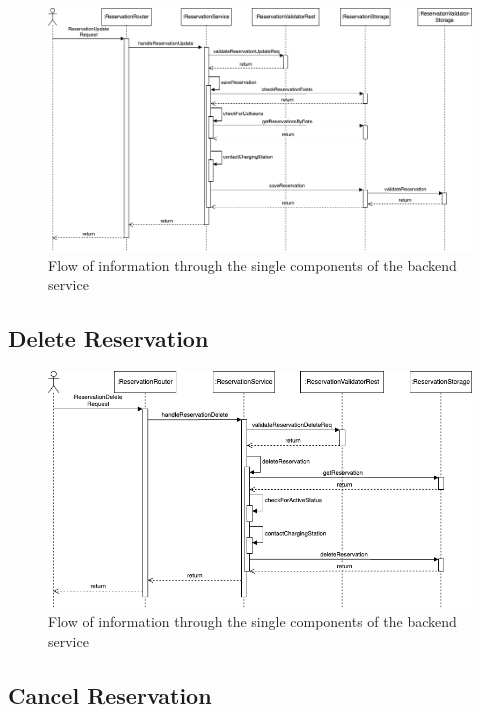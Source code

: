 \begin{figure}[!ht]
    \centering
    \includegraphics[scale=0.4]{resources/images/main/6_implementation/ReservationUpdate.png}
    \caption{Flow of information through the single components of the backend service}
    \label{fig:update-reservation-seq-flow}
\end{figure}

\subsection{Delete Reservation}
\label{ch:Implementation:sec:Implemented Use Cases:ssec:Delete Reservation}

\begin{figure}[!ht]
    \centering
    \includegraphics[scale=0.4]{resources/images/main/6_implementation/ReservationDelete.png}
    \caption{Flow of information through the single components of the backend service}
    \label{fig:delete-reservation-seq-flow}
\end{figure}

\subsection{Cancel Reservation}
\label{ch:Implementation:sec:Implemented Use Cases:ssec:Cancel Reservation}


